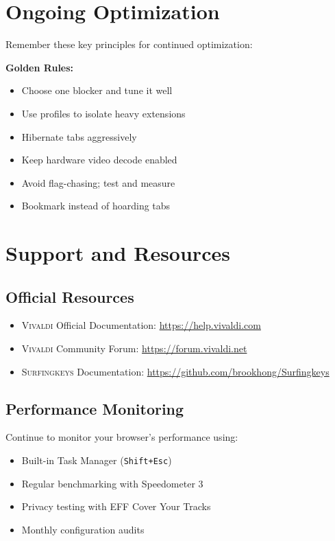 \documentclass[11pt,a4paper,oneside]{book}
\newcommand{\vivaldi}{\textsc{Vivaldi}}
\newcommand{\surfingkeys}{\textsc{Surfingkeys}}
\newcommand{\keystroke}[1]{\texttt{\color{primaryblue}#1}}
\begin{document}
\section{Ongoing Optimization}

Remember these key principles for continued optimization:

\begin{tipbox}
\textbf{Golden Rules:}
\begin{itemize}
    \item Choose one blocker and tune it well
    \item Use profiles to isolate heavy extensions
    \item Hibernate tabs aggressively
    \item Keep hardware video decode enabled
    \item Avoid flag-chasing; test and measure
    \item Bookmark instead of hoarding tabs
\end{itemize}
\end{tipbox}

\section{Support and Resources}

\subsection{Official Resources}

\begin{itemize}
    \item \vivaldi{} Official Documentation: \url{https://help.vivaldi.com}
    \item \vivaldi{} Community Forum: \url{https://forum.vivaldi.net}
    \item \surfingkeys{} Documentation: \url{https://github.com/brookhong/Surfingkeys}
\end{itemize}

\subsection{Performance Monitoring}

Continue to monitor your browser's performance using:

\begin{itemize}
    \item Built-in Task Manager (\keystroke{Shift+Esc})
    \item Regular benchmarking with Speedometer 3
    \item Privacy testing with EFF Cover Your Tracks
    \item Monthly configuration audits
\end{itemize}
\end{document}
